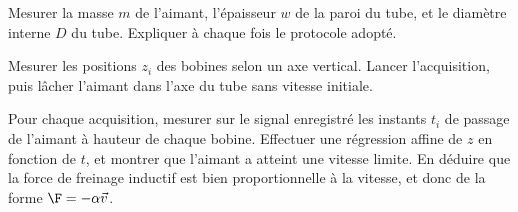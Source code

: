 \begin{protocole}
  \item Mesurer la masse $m$ de l'aimant, l'épaisseur $w$ de la paroi du tube, et le diamètre interne $D$ du tube. Expliquer à chaque fois le protocole adopté.
\item Mesurer les positions $z_i$ des bobines selon un axe vertical.
Lancer l'acquisition, puis lâcher l'aimant dans l'axe du tube sans vitesse initiale.
\item Pour chaque acquisition, mesurer sur le signal enregistré les instants $t_i$ de passage de l'aimant à hauteur de chaque bobine. Effectuer une régression affine de $z$ en fonction de $t$, et montrer que l'aimant a atteint une vitesse limite. En déduire  que la force de freinage inductif est bien proportionnelle à la vitesse, et donc de la forme $\F = -\alpha \Vec{v}$.
\end{protocole}


